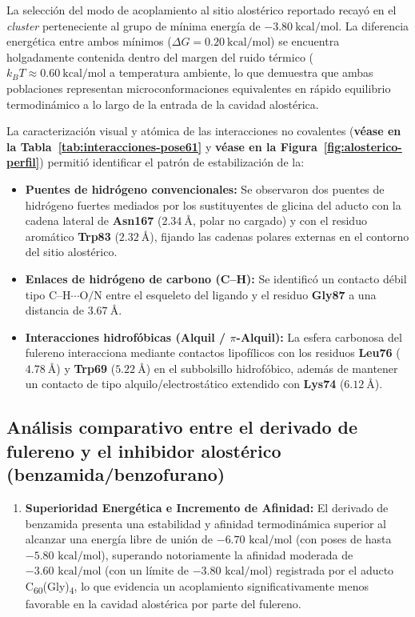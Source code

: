 \begin{table}[htbp]
La selección del modo de acoplamiento al sitio alostérico reportado recayó en el \textit{cluster} perteneciente al grupo de mínima energía de $-3.80\ \text{kcal/mol}$. La diferencia energética entre ambos mínimos ($\Delta G = 0.20\ \text{kcal/mol}$) se encuentra holgadamente contenida dentro del margen del ruido térmico ($k_B T \approx 0.60\ \text{kcal/mol}$ a temperatura ambiente, lo que demuestra que ambas poblaciones representan microconformaciones equivalentes en rápido equilibrio termodinámico a lo largo de la entrada de la cavidad alostérica.

La caracterización visual y atómica de las interacciones no covalentes (\textbf{véase en la Tabla~\ref{tab:interacciones-pose61}} y \textbf{véase en la Figura~\ref{fig:alosterico-perfil}}) permitió identificar el patrón de estabilización de la:

\begin{itemize}
    \item \textbf{Puentes de hidrógeno convencionales:} Se observaron dos puentes de hidrógeno fuertes mediados por los sustituyentes de glicina del aducto con la cadena lateral de \textbf{Asn167} ($2.34\ \text{\AA}$, polar no cargado) y con el residuo aromático \textbf{Trp83} ($2.32\ \text{\AA}$), fijando las cadenas polares externas en el contorno del sitio alostérico.
    \item \textbf{Enlaces de hidrógeno de carbono (C--H):} Se identificó un contacto débil tipo $\text{C--H}\cdots\text{O/N}$ entre el esqueleto del ligando y el residuo \textbf{Gly87} a una distancia de $3.67\ \text{\AA}$.
    \item \textbf{Interacciones hidrofóbicas (Alquil / $\pi$-Alquil):} La esfera carbonosa del fulereno interacciona mediante contactos lipofílicos con los residuos \textbf{Leu76} ($4.78\ \text{\AA}$) y \textbf{Trp69} ($5.22\ \text{\AA}$) en el subbolsillo hidrofóbico, además de mantener un contacto de tipo alquilo/electrostático extendido con \textbf{Lys74} ($6.12\ \text{\AA}$).
\end{itemize}

\subsection{Análisis comparativo entre el derivado de fulereno y el inhibidor alostérico (benzamida/benzofurano)}
\begin{enumerate}
    \item \textbf{Superioridad Energética e Incremento de Afinidad:}
    El derivado de benzamida presenta una estabilidad y afinidad termodinámica superior al alcanzar una energía libre de unión de $-6.70\text{ kcal/mol}$ (con poses de hasta $-5.80\text{ kcal/mol}$), superando notoriamente la afinidad moderada de $-3.60\text{ kcal/mol}$ (con un límite de $-3.80\text{ kcal/mol}$) registrada por el aducto C\textsubscript{60}(Gly)\textsubscript{4}, lo que evidencia un acoplamiento significativamente menos favorable en la cavidad alostérica por parte del fulereno.


\end{enumerate}
\end{table}
